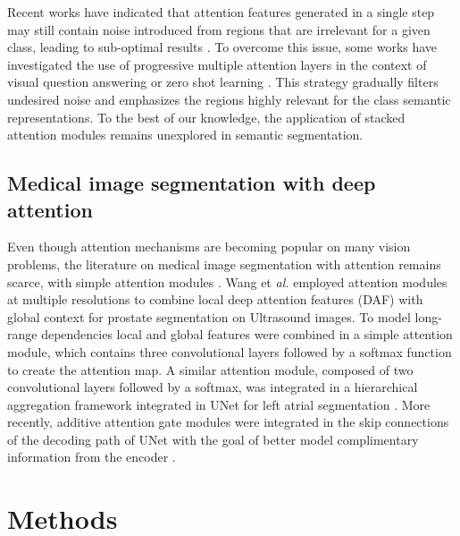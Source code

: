 \documentclass[journal]{IEEEtran}
\begin{document}

Recent works have indicated that attention features generated in a single step may still contain noise introduced from regions that are irrelevant for a given class, leading to sub-optimal results \cite{yang2016stacked,ji2018stacked}. To overcome this issue, some works have investigated the use of progressive multiple attention layers in the context of visual question answering \cite{yang2016stacked} or zero shot learning \cite{ji2018stacked}. This strategy gradually filters undesired noise and emphasizes the regions highly relevant for the class semantic representations. To the best of our knowledge, the application of stacked attention modules remains unexplored in semantic segmentation.

\subsection{Medical image segmentation with deep attention}

Even though attention mechanisms are becoming popular on many vision problems, the literature on medical image segmentation with attention remains scarce, with simple attention modules \cite{wang18d,li2018attention,schlemper2019attention,nie2018asdnet,roy2018concurrent}. Wang et \textit{al.} \cite{wang18d} employed attention modules at multiple resolutions to combine local deep attention features (DAF) with global context for prostate segmentation on Ultrasound images. To model long-range dependencies local and global features were combined in a simple attention module, which contains three convolutional layers followed by a softmax function to create the attention map. A similar attention module, composed of two convolutional layers followed by a softmax, was integrated in a hierarchical aggregation framework integrated in UNet for left atrial segmentation \cite{li2018attention}. More recently, additive attention gate modules were integrated in the skip connections of the decoding path of UNet with the goal of better model complimentary information from the encoder \cite{schlemper2019attention}.

\section{Methods}\label{sec:methods}
\end{document}
